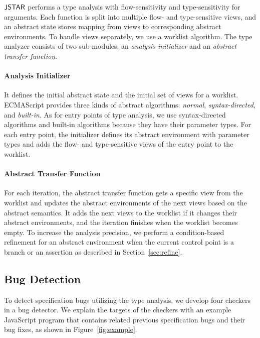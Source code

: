 $\tool$ performs a type analysis with flow-sensitivity and
type-sensitivity for arguments.
Each function is split into multiple flow- and type-sensitive views, and an
abstract state stores mapping from views to corresponding abstract environments.
To handle views separately, we use a worklist algorithm.
The type analyzer consists of two sub-modules: an \textit{analysis initializer} and an
\textit{abstract transfer function}.

\paragraph{Analysis Initializer} It defines the initial abstract state and the
initial set of views for a worklist. ECMAScript provides three
kinds of abstract algorithms: \textit{normal}, \textit{syntax-directed}, and \textit{built-in}. 
As for entry points of type analysis, we use syntax-directed algorithms and built-in algorithms
because they have their parameter types.  For each entry point, the
initializer defines its abstract environment with parameter types and adds the
flow- and type-sensitive views of the entry point to the worklist.

\paragraph{Abstract Transfer Function} For each iteration, the abstract transfer function gets a
specific view from the worklist and updates the abstract environments of the next
views based on the abstract semantics.  It adds the next views to the worklist if
it changes their abstract environments, and the iteration finishes when
the worklist becomes empty.  To increase the analysis precision, we
perform a condition-based refinement for an abstract environment when the current
control point is a branch or an assertion as described in Section~\ref{sec:refine}.

\subsection{Bug Detection}\label{sec:overview-bug-detect}

To detect specification bugs utilizing the type analysis, we develop
four checkers in a bug detector.  We explain the targets of the checkers
with an example JavaScript program that contains related previous specification bugs and
their bug fixes, as shown in Figure~\ref{fig:example}.

